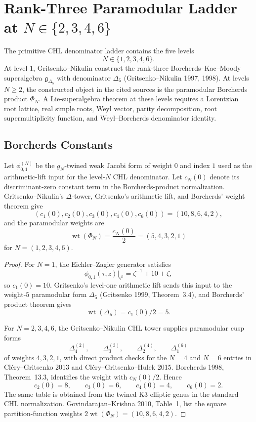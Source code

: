 \providecommand{\kBKM}{\kappa_{\mathrm{BKM}}}
\providecommand{\kcat}{\kappa_{\mathrm{cat}}}
\providecommand{\kch}{\kappa_{\mathrm{ch}}}
\providecommand{\kfib}{\kappa_{\mathrm{fiber}}}
\providecommand{\Z}{\mathbb{Z}}
\providecommand{\DeltaFive}{\Delta_5}
\providecommand{\DFive}{D_5}
\providecommand{\fg}{\mathfrak{g}}

\section*{Rank-Three Paramodular Ladder at
$N\in\{2,3,4,6\}$}
\label{sec:gn-rank3-bkm-tower}

The primitive CHL denominator ladder contains the five levels
\[
  N\in\{1,2,3,4,6\}.
\]
At level \(1\), Gritsenko--Nikulin construct the rank-three
Borcherds--Kac--Moody superalgebra \(\fg_{\DeltaFive}\) with denominator
\(\DeltaFive\) (Gritsenko--Nikulin 1997, 1998). At levels \(N\geq2\),
the constructed object in the cited sources is the paramodular
Borcherds product \(\Phi_N\). A Lie-superalgebra theorem at these
levels requires a Lorentzian root lattice, real simple roots, Weyl
vector, parity decomposition, root supermultiplicity function, and
Weyl--Borcherds denominator identity.

\subsection*{Borcherds Constants}

Let \(\phi^{(N)}_{0,1}\) be the \(g_N\)-twined weak Jacobi form of
weight \(0\) and index \(1\) used as the arithmetic-lift input for the
level-\(N\) CHL denominator. Let \(c_N(0)\) denote its discriminant-zero
constant term in the Borcherds-product normalization.
Gritsenko--Nikulin's \(\Delta\)-tower, Gritsenko's arithmetic lift, and
Borcherds' weight theorem give
\[
  (c_1(0),c_2(0),c_3(0),c_4(0),c_6(0))
  =
  (10,8,6,4,2),
\]
and the paramodular weights are
\[
  \operatorname{wt}(\Phi_N)
  =
  \frac{c_N(0)}{2}
  =
  (5,4,3,2,1)
\]
for \(N=(1,2,3,4,6)\).

\begin{proof}
For \(N=1\), the Eichler--Zagier generator satisfies
\[
  \phi_{0,1}(\tau,z)|_{q^0}
  =
  \zeta^{-1}+10+\zeta ,
\]
so \(c_1(0)=10\). Gritsenko's level-one arithmetic lift sends this input
to the weight-\(5\) paramodular form \(\DeltaFive\) (Gritsenko 1999,
Theorem~3.4), and Borcherds' product theorem gives
\[
  \operatorname{wt}(\DeltaFive)=c_1(0)/2=5.
\]

For \(N=2,3,4,6\), the Gritsenko--Nikulin CHL tower supplies
paramodular cusp forms
\[
  \Delta_{4}^{(2)},\qquad
  \Delta_{3}^{(3)},\qquad
  \Delta_{2}^{(4)},\qquad
  \Delta_{1}^{(6)}
\]
of weights \(4,3,2,1\), with direct product checks for the \(N=4\)
and \(N=6\) entries in Cl\'ery--Gritsenko 2013 and
Cl\'ery--Gritsenko--Hulek 2015. Borcherds 1998, Theorem~13.3,
identifies the weight with \(c_N(0)/2\). Hence
\[
  c_2(0)=8,\qquad c_3(0)=6,\qquad c_4(0)=4,\qquad c_6(0)=2 .
\]
The same table is obtained from the twined K3 elliptic genus in the
standard CHL normalization. Govindarajan--Krishna 2010, Table~1, list
the square partition-function weights
\(2\operatorname{wt}(\Phi_N)=(10,8,6,4,2)\).
\end{proof}

